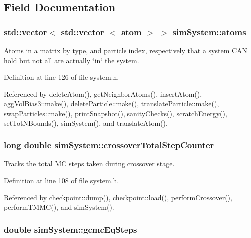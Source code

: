 \subsection{Field Documentation}
\hypertarget{classsim_system_a90421b19082f7fb8fc23b7264b1161e4}{
\subsubsection[{atoms}]{\setlength{\rightskip}{0pt plus 5cm}std\-::vector$<$ std\-::vector $<$ {\bf atom} $>$ $>$ sim\-System\-::atoms}}\label{classsim_system_a90421b19082f7fb8fc23b7264b1161e4}


Atoms in a matrix by type, and particle index, respectively that a system C\-A\-N hold but not all are actually \char`\"{}in\char`\"{} the system. 



Definition at line 126 of file system.\-h.



Referenced by delete\-Atom(), get\-Neighbor\-Atoms(), insert\-Atom(), agg\-Vol\-Bias3\-::make(), delete\-Particle\-::make(), translate\-Particle\-::make(), swap\-Particles\-::make(), print\-Snapshot(), sanity\-Checks(), scratch\-Energy(), set\-Tot\-N\-Bounds(), sim\-System(), and translate\-Atom().

\hypertarget{classsim_system_a1d71d1df76bba70136853e30823d2db9}{
\subsubsection[{crossover\-Total\-Step\-Counter}]{\setlength{\rightskip}{0pt plus 5cm}long double sim\-System\-::crossover\-Total\-Step\-Counter}}\label{classsim_system_a1d71d1df76bba70136853e30823d2db9}


Tracks the total M\-C steps taken during crossover stage. 



Definition at line 108 of file system.\-h.



Referenced by checkpoint\-::dump(), checkpoint\-::load(), perform\-Crossover(), perform\-T\-M\-M\-C(), and sim\-System().

\hypertarget{classsim_system_aa83fc40dca4aa56d890dbc978da1ea4e}{
\subsubsection[{gcmc\-Eq\-Steps}]{\setlength{\rightskip}{0pt plus 5cm}double sim\-System\-::gcmc\-Eq\-Steps}}\label{classsim_system_aa83fc40dca4aa56d890dbc978da1ea4e}


